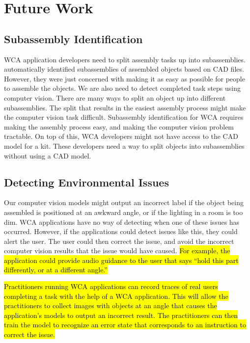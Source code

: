 \section{Future Work}

\subsection{Subassembly Identification}

WCA application developers need to split assembly tasks up into subassemblies.
\citet{subassembly_identification} automatically identified subassemblies of
assembled objects based on CAD files.
However, they were just concerned with making it as easy as possible for people
to assemble the objects.
We are also need to detect completed task steps using computer vision.
There are many ways to split an object up into different subassemblies.
The split that results in the easiest assembly process might make the computer
vision task difficult.
Subassembly identification for WCA requires making the assembly process easy,
and making the computer vision problem tractable.
On top of this, WCA developers might not have access to the CAD model for a kit.
These developers need a way to split objects into subassemblies without using
a CAD model.

\subsection{Detecting Environmental Issues}

Our computer vision models might output an incorrect label if the object being
assembled is positioned at an awkward angle, or if the lighting in a room is
too dim.
WCA applications have no way of detecting when one of these issues has
occurred.
However, if the applications could detect issues like this, they could alert the
user.
The user could then correct the issue, and avoid the incorrect computer vision
results that the issue would have caused.
\hl{
  For example, the application could provide audio guidance to the user that
  says ``hold this part differently, or at a different angle.''
}

\hl{
  Practitioners running WCA applications can record traces of real users
  completing a task with the help of a WCA application.
  This will allow the practitioners to collect images with objects at an angle
  that causes the application's models to output an incorrect result.
  The practitioners can then train the model to recognize an error state that
  corresponds to an instruction to correct the issue.
}

